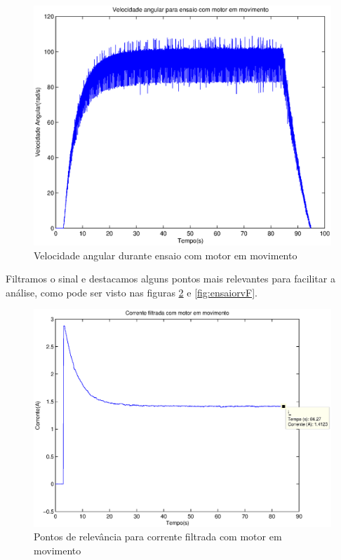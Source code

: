 \documentclass{article}
\begin{document}
\begin{figure}[H]
	\centering
	\includegraphics[width=0.8\linewidth]{../ensaiorv}
	\caption{Velocidade angular durante ensaio com motor em movimento}
	\label{fig:ensaiorv}
\end{figure}

Filtramos o sinal e destacamos alguns pontos mais relevantes para facilitar a análise, como pode ser visto nas figuras \ref{fig:ensaioriF} e \ref{fig:ensaiorvF}.
\begin{figure}[H]
	\centering
	\includegraphics[width=0.8\linewidth]{../ensaioriF}
	\caption{Pontos de relevância para corrente filtrada com motor em movimento}
	\label{fig:ensaioriF}
\end{figure}
\end{document}
